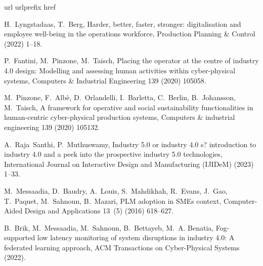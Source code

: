 \documentclass[review,12pt, 3p, times]{elsarticle}
\begin{document}
% 
%  

 
 



\begin{thebibliography}{00}
\expandafter\ifx\csname url\endcsname\relax
  \def\url#1{\texttt{#1}}\fi
\expandafter\ifx\csname urlprefix\endcsname\relax\def\urlprefix{URL }\fi
\expandafter\ifx\csname href\endcsname\relax
  \def\href#1#2{#2} \def\path#1{#1}\fi

H.~Lyngstadaas, T.~Berg, Harder, better, faster, stronger: digitalisation and
  employee well-being in the operations workforce, Production Planning \&
  Control (2022) 1--18.

P.~Fantini, M.~Pinzone, M.~Taisch, Placing the operator at the centre of
  industry 4.0 design: Modelling and assessing human activities within
  cyber-physical systems, Computers \& Industrial Engineering 139 (2020)
  105058.

M.~Pinzone, F.~Alb{\`e}, D.~Orlandelli, I.~Barletta, C.~Berlin, B.~Johansson,
  M.~Taisch, A framework for operative and social sustainability
  functionalities in human-centric cyber-physical production systems, Computers
  \& industrial engineering 139 (2020) 105132.

A.~Raja~Santhi, P.~Muthuswamy, Industry 5.0 or industry 4.0 s? introduction to
  industry 4.0 and a peek into the prospective industry 5.0 technologies,
  International Journal on Interactive Design and Manufacturing (IJIDeM) (2023)
  1--33.

M.~Messaadia, D.~Baudry, A.~Louis, S.~Mahdikhah, R.~Evans, J.~Gao, T.~Paquet,
  M.~Sahnoun, B.~Mazari, {PLM} adoption in {SME}s context, Computer-Aided
  Design and Applications 13~(5) (2016) 618--627.

B.~Brik, M.~Messaadia, M.~Sahnoun, B.~Bettayeb, M.~A. Benatia, Fog-supported
  low latency monitoring of system disruptions in industry 4.0: A federated
  learning approach, ACM Transactions on Cyber-Physical Systems (2022).


\end{thebibliography}
\end{document}
